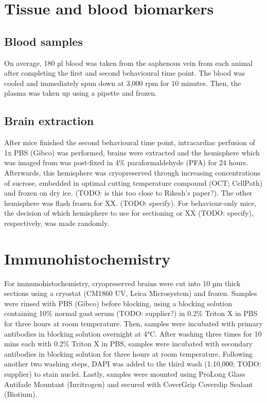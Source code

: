 \section{Tissue and blood biomarkers}
\subsection{Blood samples}
On average, 180 µl blood was taken from the saphenous vein from each animal after completing the first and second behavioural time point. The blood was cooled and immediately spun down at 3,000 rpm for 10 minutes. Then, the plasma was taken up using a pipette and frozen.
\subsection{Brain extraction}
After mice finished the second behavioural time point, intracardiac perfusion of 1x PBS (Gibco) was performed, brains were extracted and the hemisphere which was imaged from was post-fixed in 4\% paraformaldehyde (PFA) for 24 hours. Afterwards, this hemisphere was cryopreserved through increasing concentrations of sucrose, embedded in optimal cutting temperature compound (OCT; CellPath) and frozen on dry ice. (TODO: is this too close to Rikesh's paper?). The other hemisphere was flash frozen for XX. (TODO: specify).
For behaviour-only mice, the decision of which hemisphere to use for sectioning or XX (TODO: specify), respectively, was made randomly.
\section{Immunohistochemistry}
\label{Immunohistochemistry}
For immunohistochemistry, cryopreserved brains were cut into 10 µm thick sections using a cryostat (CM1860 UV, Leica Microsystem) and frozen.
Samples were rinsed with PBS (Gibco) before blocking, using a blocking solution containing 10\% normal goat serum (TODO: supplier?) in 0.2\% Triton X in PBS for three hours at room temperature. Then, samples were incubated with primary antibodies in blocking solution overnight at 4°C.
After washing three times for 10 mins each with 0.2\% Triton X in PBS, samples were incubated with secondary antibodies in blocking solution for three hours at room temperature.
Following another two washing steps, DAPI was added to the third wash (1:10,000; TODO: supplier) to stain nuclei.
Lastly, samples were mounted using ProLong Glass Antifade Mountant (Invitrogen) and secured with CoverGrip Coverslip Sealant (Biotium).
